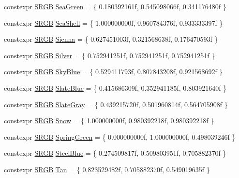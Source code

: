 \begin{DoxyCompactItemize}
constexpr \hyperlink{structmage_1_1_s_r_g_b}{S\+R\+GB} \hyperlink{namespacemage_1_1color_a08a9dd84d3682c032af641e4eb2de2dc}{Sea\+Green} = \{ 0.\+180392161f, 0.\+545098066f, 0.\+341176480f \}
\item 
constexpr \hyperlink{structmage_1_1_s_r_g_b}{S\+R\+GB} \hyperlink{namespacemage_1_1color_a5e4243f642decadd295b985c23e2d33c}{Sea\+Shell} = \{ 1.\+000000000f, 0.\+960784376f, 0.\+933333397f \}
\item 
constexpr \hyperlink{structmage_1_1_s_r_g_b}{S\+R\+GB} \hyperlink{namespacemage_1_1color_a805d6bfd5de14dc964ad41f06350edb1}{Sienna} = \{ 0.\+627451003f, 0.\+321568638f, 0.\+176470593f \}
\item 
constexpr \hyperlink{structmage_1_1_s_r_g_b}{S\+R\+GB} \hyperlink{namespacemage_1_1color_aa07a6c3c5a18af608248962707b71a6f}{Silver} = \{ 0.\+752941251f, 0.\+752941251f, 0.\+752941251f \}
\item 
constexpr \hyperlink{structmage_1_1_s_r_g_b}{S\+R\+GB} \hyperlink{namespacemage_1_1color_a2a8dee46433148215b90b8c77fd4d209}{Sky\+Blue} = \{ 0.\+529411793f, 0.\+807843208f, 0.\+921568692f \}
\item 
constexpr \hyperlink{structmage_1_1_s_r_g_b}{S\+R\+GB} \hyperlink{namespacemage_1_1color_addb1a03f77a6146fe2643fdff6fc5126}{Slate\+Blue} = \{ 0.\+415686309f, 0.\+352941185f, 0.\+803921640f \}
\item 
constexpr \hyperlink{structmage_1_1_s_r_g_b}{S\+R\+GB} \hyperlink{namespacemage_1_1color_a5865dae79b0eff15705ab5f883e19178}{Slate\+Gray} = \{ 0.\+439215720f, 0.\+501960814f, 0.\+564705908f \}
\item 
constexpr \hyperlink{structmage_1_1_s_r_g_b}{S\+R\+GB} \hyperlink{namespacemage_1_1color_a91a2d603aba08879ab87e393244e8d84}{Snow} = \{ 1.\+000000000f, 0.\+980392218f, 0.\+980392218f \}
\item 
constexpr \hyperlink{structmage_1_1_s_r_g_b}{S\+R\+GB} \hyperlink{namespacemage_1_1color_a10fed0e68980c7f4e10142709909c5b4}{Spring\+Green} = \{ 0.\+000000000f, 1.\+000000000f, 0.\+498039246f \}
\item 
constexpr \hyperlink{structmage_1_1_s_r_g_b}{S\+R\+GB} \hyperlink{namespacemage_1_1color_a50f46b6560f7289dcc92f9f651af327d}{Steel\+Blue} = \{ 0.\+274509817f, 0.\+509803951f, 0.\+705882370f \}
\item 
constexpr \hyperlink{structmage_1_1_s_r_g_b}{S\+R\+GB} \hyperlink{namespacemage_1_1color_a577b28080c4ce3c690ec9f6e82012e11}{Tan} = \{ 0.\+823529482f, 0.\+705882370f, 0.\+549019635f \}
\item 

\end{DoxyCompactItemize}
